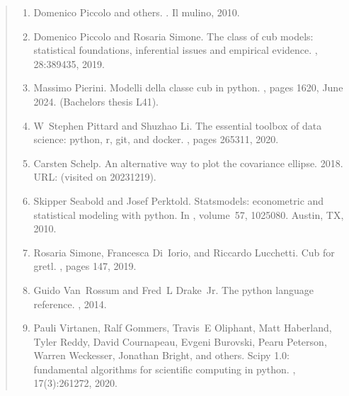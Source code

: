 \documentclass[letterpaper,10pt,english]{sphinxmanual}
\begin{document}
\begin{quote}
\begin{enumerate}
\item {} 
\sphinxAtStartPar
Domenico Piccolo and others. . Il mulino, 2010.

\item {} 
\sphinxAtStartPar
Domenico Piccolo and Rosaria Simone. The class of cub models: statistical foundations, inferential issues and empirical evidence. , 28:389\textendash{}435, 2019.

\item {} 
\sphinxAtStartPar
Massimo Pierini. Modelli della classe cub in python. , pages 16\textendash{}20, June 2024. (Bachelor\textquotesingle{}s thesis L\sphinxhyphen{}41).

\item {} 
\sphinxAtStartPar
W Stephen Pittard and Shuzhao Li. The essential toolbox of data science: python, r, git, and docker. , pages 265\textendash{}311, 2020.

\item {} 
\sphinxAtStartPar
Carsten Schelp. An alternative way to plot the covariance ellipse. 2018. URL:  (visited on 2023\sphinxhyphen{}12\sphinxhyphen{}19).

\item {} 
\sphinxAtStartPar
Skipper Seabold and Josef Perktold. Statsmodels: econometric and statistical modeling with python. In , volume 57, 10\textendash{}25080. Austin, TX, 2010.

\item {} 
\sphinxAtStartPar
Rosaria Simone, Francesca Di Iorio, and Riccardo Lucchetti. Cub for gretl. , pages 147, 2019.

\item {} 
\sphinxAtStartPar
Guido Van Rossum and Fred L Drake Jr. The python language reference. , 2014.

\item {} 
\sphinxAtStartPar
Pauli Virtanen, Ralf Gommers, Travis E Oliphant, Matt Haberland, Tyler Reddy, David Cournapeau, Evgeni Burovski, Pearu Peterson, Warren Weckesser, Jonathan Bright, and others. Scipy 1.0: fundamental algorithms for scientific computing in python. , 17(3):261\textendash{}272, 2020.


\end{enumerate}
\end{quote}
\end{document}
